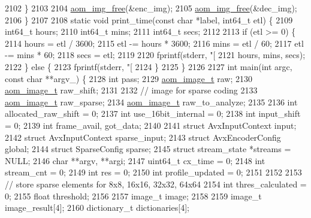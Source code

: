\begin{DoxyCodeInclude}
{{{{{{{{{{{{{{{{{{{{{{{{{{{{{{{{{{{{{{{{{{{{{{{{{{{{{{{{{{{2102   \}
2103 
2104   \hyperlink{aom__image_8h_afff22f7f3eb9409c5b678d1962f110a8}{aom\_img\_free}(&enc\_img);
2105   \hyperlink{aom__image_8h_afff22f7f3eb9409c5b678d1962f110a8}{aom\_img\_free}(&dec\_img);
2106 \}
2107 
2108 \textcolor{keyword}{static} \textcolor{keywordtype}{void} print\_time(\textcolor{keyword}{const} \textcolor{keywordtype}{char} *label, int64\_t etl) \{
2109   int64\_t hours;
2110   int64\_t mins;
2111   int64\_t secs;
2112 
2113   \textcolor{keywordflow}{if} (etl >= 0) \{
2114     hours = etl / 3600;
2115     etl -= hours * 3600;
2116     mins = etl / 60;
2117     etl -= mins * 60;
2118     secs = etl;
2119 
2120     fprintf(stderr, \textcolor{stringliteral}{"[%
2121         hours, mins, secs);
2122   \} \textcolor{keywordflow}{else} \{
2123     fprintf(stderr, \textcolor{stringliteral}{"[%
2124   \}
2125 \}
2126 
2127 \textcolor{keywordtype}{int} main(\textcolor{keywordtype}{int} argc, \textcolor{keyword}{const} \textcolor{keywordtype}{char} **argv\_) \{
2128   \textcolor{keywordtype}{int} pass;
2129   \hyperlink{structaom__image}{aom\_image\_t} raw;
2130   \hyperlink{structaom__image}{aom\_image\_t} raw\_shift;
2131 
2132   \textcolor{comment}{// image for sparse coding}
2133   \hyperlink{structaom__image}{aom\_image\_t} raw\_sparse;
2134   \hyperlink{structaom__image}{aom\_image\_t} raw\_to\_analyze;
2135 
2136   \textcolor{keywordtype}{int} allocated\_raw\_shift = 0;
2137   \textcolor{keywordtype}{int} use\_16bit\_internal = 0;
2138   \textcolor{keywordtype}{int} input\_shift = 0;
2139   \textcolor{keywordtype}{int} frame\_avail, got\_data;
2140 
2141   \textcolor{keyword}{struct }AvxInputContext input;
2142   \textcolor{keyword}{struct }AvxInputContext sparse\_input;
2143   \textcolor{keyword}{struct }AvxEncoderConfig global;
2144   \textcolor{keyword}{struct }SparseConfig sparse;
2145   \textcolor{keyword}{struct }stream\_state *streams = NULL;
2146   \textcolor{keywordtype}{char} **argv, **argi;
2147   uint64\_t cx\_time = 0;
2148   \textcolor{keywordtype}{int} stream\_cnt = 0;
2149   \textcolor{keywordtype}{int} res = 0;
2150   \textcolor{keywordtype}{int} profile\_updated = 0;
2151 
2152 
2153   \textcolor{comment}{// store sparse elements for 8x8, 16x16, 32x32, 64x64}
2154   \textcolor{keywordtype}{int} thres\_calculated = 0;
2155   \textcolor{keywordtype}{float} threshold;
2156 
2157   image\_t image;
2158 
2159   image\_t image\_result[4];
2160   dictionary\_t dictionaries[4];
}}}}}}}}}}}}}}}}}}}}}}}}}}}}}}}}}}}}}}}}}}}}}}}}}}}}}}}}}}}}}
\end{DoxyCodeInclude}
